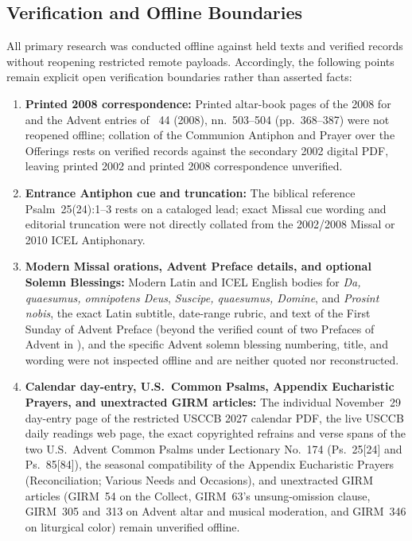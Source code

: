 \subsection{Verification and Offline Boundaries}
All primary research was conducted offline against held texts and verified records without reopening restricted remote payloads. Accordingly, the following points remain explicit open verification boundaries rather than asserted facts:
\begin{enumerate}
\item \textbf{Printed 2008  correspondence:} Printed altar-book pages of the 2008  for  and the Advent entries of ~44 (2008), nn.~503--504 (pp.~368--387) were not reopened offline; collation of the Communion Antiphon and Prayer over the Offerings rests on verified records against the secondary 2002 digital PDF, leaving printed 2002 and printed 2008 correspondence unverified.
\item \textbf{Entrance Antiphon cue and truncation:} The biblical reference Psalm~25(24):1--3 rests on a cataloged lead; exact Missal cue wording and editorial truncation were not directly collated from the 2002/2008 Missal or 2010 ICEL Antiphonary.
\item \textbf{Modern Missal orations, Advent Preface details, and optional Solemn Blessings:} Modern Latin and ICEL English bodies for \emph{Da, quaesumus, omnipotens Deus}, \emph{Suscipe, quaesumus, Domine}, and \emph{Prosint nobis}, the exact Latin subtitle, date-range rubric, and text of the First Sunday of Advent Preface (beyond the verified count of two Prefaces of Advent in ), and the specific Advent solemn blessing numbering, title, and wording were not inspected offline and are neither quoted nor reconstructed.
\item \textbf{Calendar day-entry, U.S.\ Common Psalms, Appendix Eucharistic Prayers, and unextracted GIRM articles:} The individual November~29 day-entry page of the restricted USCCB 2027 calendar PDF, the live USCCB daily readings web page, the exact copyrighted refrains and verse spans of the two U.S.\ Advent Common Psalms under Lectionary No.~174 (Ps.~25[24] and Ps.~85[84]), the seasonal compatibility of the Appendix Eucharistic Prayers (Reconciliation; Various Needs and Occasions), and unextracted GIRM articles (GIRM~54 on the Collect, GIRM~63's unsung-omission clause, GIRM~305 and~313 on Advent altar and musical moderation, and GIRM~346 on liturgical color) remain unverified offline.
\end{enumerate}

